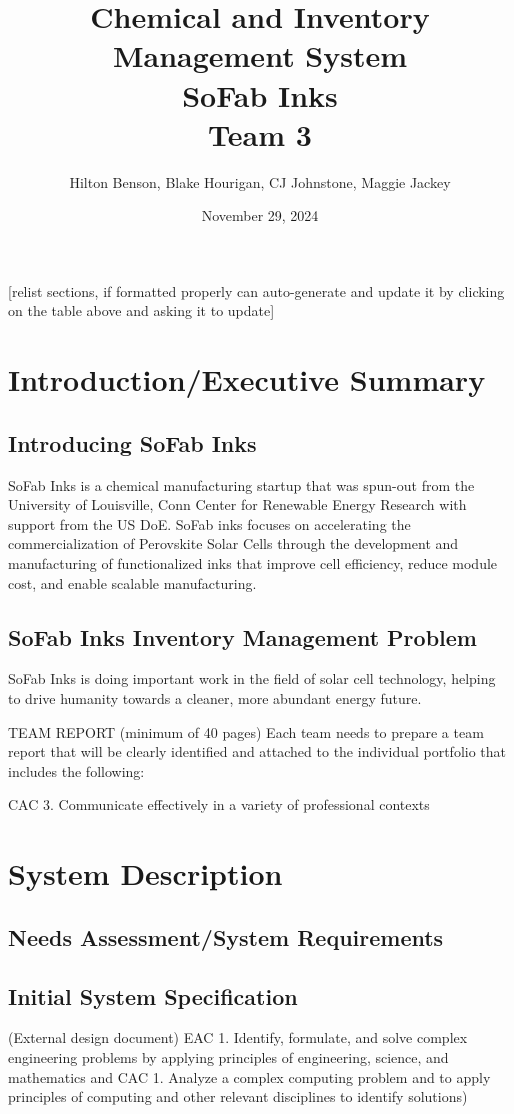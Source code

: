 \documentclass{article}
\title{Chemical and Inventory Management System \\ SoFab Inks \\ Team 3}
\date{November 29, 2024}
\author{Hilton Benson, Blake Hourigan, CJ Johnstone, Maggie Jackey}
\begin{document}
  
\maketitle
\clearpage
\tableofcontents
\clearpage

[relist sections, if formatted properly can auto-generate and update it by clicking on the table above and asking it to update] 

\section{Introduction\slash Executive Summary} 
\subsection{Introducing SoFab Inks}
SoFab Inks is a chemical manufacturing startup that was spun-out from the University of Louisville, Conn Center for Renewable Energy 
Research with support from the US DoE. SoFab inks focuses on accelerating the commercialization of Perovskite Solar Cells 
through the development and manufacturing of functionalized inks that improve cell efficiency, reduce module cost, and enable scalable 
manufacturing. \cite{sofabinks}
\subsection{SoFab Inks Inventory Management Problem}
SoFab Inks is doing important work in the field of solar cell technology, helping to drive humanity towards a cleaner, more abundant
energy future.


TEAM REPORT (minimum of 40 pages) 
Each team needs to prepare a team report that will be clearly identified and attached to the 
individual portfolio that includes the following: 

CAC 3. Communicate effectively in a variety of professional contexts 

\section{System Description}

\subsection{Needs Assessment\slash System Requirements}
\subsection{Initial System Specification}
(External design document) 
    EAC 1. Identify, formulate, and solve complex engineering problems by 
    applying principles of engineering, science, and mathematics and CAC 1. 
    Analyze a complex computing problem and to apply principles of computing 
    and other relevant disciplines to identify solutions) 
\end{document}
